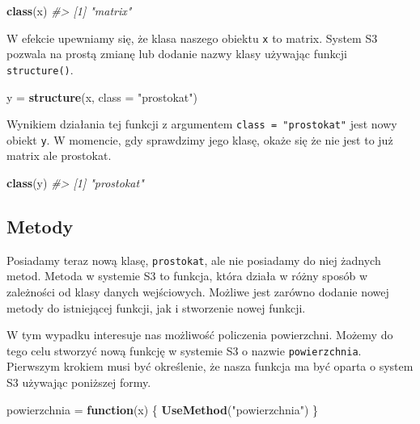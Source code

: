 \documentclass[paper=6in:9in,pagesize=pdftex,headinclude=on,footinclude=on,10pt]{scrbook}
\newenvironment{Shaded}{\begin{snugshade}}{\end{snugshade}}
\newcommand{\CommentTok}[1]{\textcolor[rgb]{0.56,0.35,0.01}{\textit{#1}}}
\newcommand{\ControlFlowTok}[1]{\textcolor[rgb]{0.13,0.29,0.53}{\textbf{#1}}}
\newcommand{\DataTypeTok}[1]{\textcolor[rgb]{0.13,0.29,0.53}{#1}}
\newcommand{\KeywordTok}[1]{\textcolor[rgb]{0.13,0.29,0.53}{\textbf{#1}}}
\newcommand{\NormalTok}[1]{#1}
\newcommand{\StringTok}[1]{\textcolor[rgb]{0.31,0.60,0.02}{#1}}
\begin{document}
\begin{Shaded}
\begin{Highlighting}[]
\KeywordTok{class}\NormalTok{(x)}
\CommentTok{#> [1] "matrix"}
\end{Highlighting}
\end{Shaded}

W efekcie upewniamy się, że klasa naszego obiektu \texttt{x} to matrix.
System S3 pozwala na prostą zmianę lub dodanie nazwy klasy używając funkcji \texttt{structure()}.

\begin{Shaded}
\begin{Highlighting}[]
\NormalTok{y =}\StringTok{ }\KeywordTok{structure}\NormalTok{(x, }\DataTypeTok{class =} \StringTok{"prostokat"}\NormalTok{)}
\end{Highlighting}
\end{Shaded}

Wynikiem działania tej funkcji z argumentem \texttt{class\ =\ "prostokat"} jest nowy obiekt \texttt{y}.
W momencie, gdy sprawdzimy jego klasę, okaże się że nie jest to już matrix ale prostokat.

\begin{Shaded}
\begin{Highlighting}[]
\KeywordTok{class}\NormalTok{(y)}
\CommentTok{#> [1] "prostokat"}
\end{Highlighting}
\end{Shaded}

\hypertarget{metody}{%
\subsection{Metody}\label{metody}}

Posiadamy teraz nową klasę, \texttt{prostokat}, ale nie posiadamy do niej żadnych metod.
Metoda w systemie S3 to funkcja, która działa w różny sposób w zależności od klasy danych wejściowych.
Możliwe jest zarówno dodanie nowej metody do istniejącej funkcji, jak i stworzenie nowej funkcji.

W tym wypadku interesuje nas możliwość policzenia powierzchni.
Możemy do tego celu stworzyć nową funkcję w systemie S3 o nazwie \texttt{powierzchnia}.
Pierwszym krokiem musi być określenie, że nasza funkcja ma być oparta o system S3 używając poniższej formy.

\begin{Shaded}
\begin{Highlighting}[]
\NormalTok{powierzchnia =}\StringTok{ }\ControlFlowTok{function}\NormalTok{(x) \{}
  \KeywordTok{UseMethod}\NormalTok{(}\StringTok{"powierzchnia"}\NormalTok{)}
\NormalTok{\}}
\end{Highlighting}
\end{Shaded}
\end{document}
